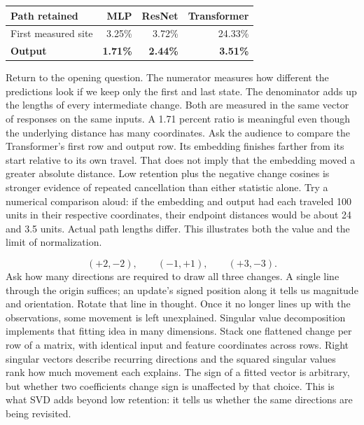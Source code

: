 {\begin{center}\renewcommand{\arraystretch}{1.4}
\begin{tabular}{@{}lrrr@{}}\toprule
Path retained & MLP & ResNet & Transformer\\\midrule
First measured site & 3.25\% & 3.72\% & 24.33\%\\
\textbf{Output} & \textbf{1.71\%} & \textbf{2.44\%} & \textbf{3.51\%}\\\bottomrule
\end{tabular}\end{center}
\vspace{4mm}}
{Return to the opening question. The numerator measures how different the predictions look if we keep only the first and last state. The denominator adds up the lengths of every intermediate change. Both are measured in the same vector of responses on the same inputs. A 1.71 percent ratio is meaningful even though the underlying distance has many coordinates. Ask the audience to compare the Transformer's first row and output row. Its embedding finishes farther from its start relative to its own travel. That does not imply that the embedding moved a greater absolute distance. Low retention plus the negative change cosines is stronger evidence of repeated cancellation than either statistic alone. Try a numerical comparison aloud: if the embedding and output had each traveled 100 units in their respective coordinates, their endpoint distances would be about 24 and 3.5 units. Actual path lengths differ. This illustrates both the value and the limit of normalization.}

{
\[
    (+2,-2),\qquad(-1,+1),\qquad(+3,-3).
\]
\vspace{2mm}}
{Ask how many directions are required to draw all three changes. A single line through the origin suffices; an update's signed position along it tells us magnitude and orientation. Rotate that line in thought. Once it no longer lines up with the observations, some movement is left unexplained. Singular value decomposition implements that fitting idea in many dimensions. Stack one flattened change per row of a matrix, with identical input and feature coordinates across rows. Right singular vectors describe recurring directions and the squared singular values rank how much movement each explains. The sign of a fitted vector is arbitrary, but whether two coefficients change sign is unaffected by that choice. This is what SVD adds beyond low retention: it tells us whether the same directions are being revisited.}

